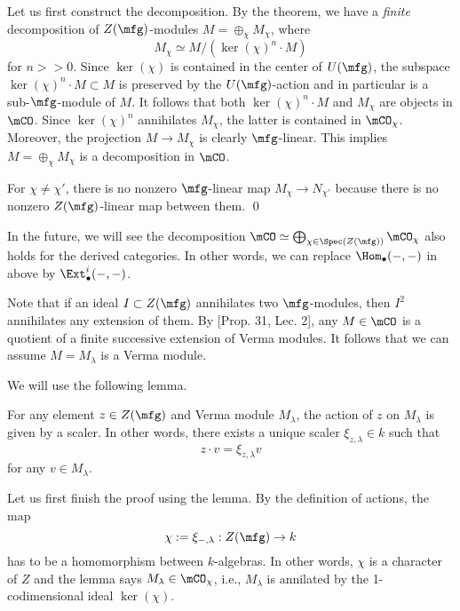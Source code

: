 \proof
	Let us first construct the decomposition. By the theorem, we have a \emph{finite} decomposition of $Z(\mfg)$-modules $M = \oplus_\chi M_\chi$, where
	\[
		M_\chi \simeq M/(\ker(\chi)^n\cdot M)
	\]
	for $n>>0$. Since $\ker(\chi)$ is contained in the center of $U(\mfg)$, the subspace $\ker(\chi)^n\cdot M \subset M$ is preserved by the $U(\mfg)$-action and in particular is a sub-$\mfg$-module of $M$. It follows that both $\ker(\chi)^n\cdot M $ and $M_\chi$ are objects in $\mCO$. Since $\ker(\chi)^n$ annihilates $M_\chi$, the latter is contained in $\mCO_\chi$. Moreover, the projection $M\to M_\chi$ is clearly $\mfg$-linear. This implies $M = \oplus_\chi M_\chi$ is a decomposition in $\mCO$.

	For $\chi\neq \chi'$, there is no nonzero $\mfg$-linear map $M_\chi \to N_{\chi'}$ because there is no nonzero $Z(\mfg)$-linear map between them. 
\qed

\begin{rem}
	In the future, we will see the decomposition $\mCO \simeq \bigoplus_{\chi\in \Spec(Z(\mfg))} \mCO_\chi$ also holds for the derived categories. In other words, we can replace $\Hom_\bullet(-,-)$ in above by $\Ext^i_\bullet(-,-)$.
\end{rem}



	Note that if an ideal $I\subset Z(\mfg)$ annihilates two $\mfg$-modules, then $I^2$ annihilates any extension of them. By [Prop. 31, Lec. 2], any $M\in \mCO$ is a quotient of a finite successive extension of Verma modules. It follows that we can assume $M=M_\lambda$ is a Verma module. 

	We will use the following lemma.

\begin{lem}
	\label{lem-central-characer-Verma}
	For any element $z\in Z(\mfg)$ and Verma module $M_\lambda$, the action of $z$ on $M_\lambda$ is given by a scaler. In other words, there exists a unique scaler $\xi_{z,\lambda}\in k$ such that
	\[
		z\cdot v = \xi_{z,\lambda}v
	\]
	for any $v\in M_\lambda$.
\end{lem}
	
	Let us first finish the proof using the lemma. By the definition of actions, the map 
	\[
		\chi:=\xi_{-,\lambda}:Z(\mfg) \to k
	\]
	has to be a homomorphism between $k$-algebras. In other words, $\chi$ is a character of $Z$ and the lemma says $M_\lambda \in \mCO_\chi$, i.e., $M_\lambda$ is annilated by the 1-codimensional ideal $\ker(\chi)$.

